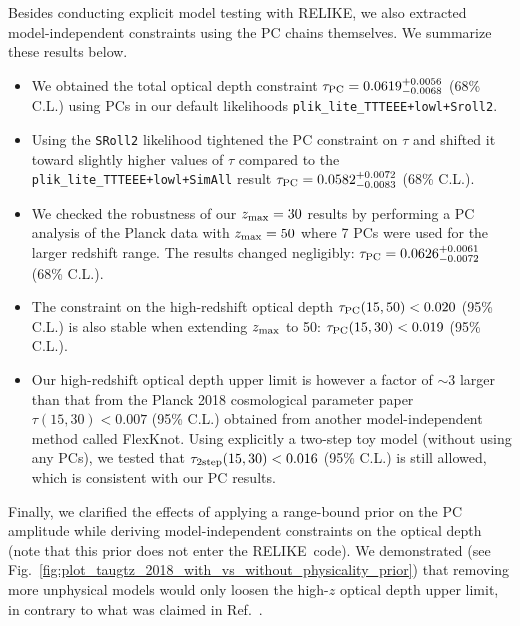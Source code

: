 \documentclass[prd,twocolumn,amsmath,amssymb,floatfix,superscriptaddress,nofootinbib]{revtex4-1}
\newcommand{\zmax}{z_{\rm max}}
\newcommand{\relike}{RELIKE}%
\begin{document}
{Besides conducting explicit model testing with  \relike, we also extracted model-independent constraints using the PC chains themselves. We summarize these results below.

\begin{itemize}

    \item {We obtained the total optical depth constraint $\tau_{\rm PC} = 0.0619^{+0.0056}_{-0.0068}$ (68\% C.L.) 
    using PCs in our default likelihoods \texttt{plik\_lite\_TTTEEE+lowl+Sroll2}.}
    
    \item {Using the \texttt{SRoll2} likelihood tightened the PC constraint on $\tau$ and shifted it toward slightly higher values of $\tau$ compared to the \texttt{plik\_lite\_TTTEEE+lowl+SimAll} result $\tau_{\rm PC} = 0.0582 ^{+0.0072}_{-0.0083}$ (68\% C.L.).}
    
    \item {We checked the robustness of our $\zmax=30$ results by performing a PC analysis of the Planck data with $\zmax = 50$ where 7 PCs were used for the larger redshift range. The results changed negligibly: $\tau_{\rm PC} = 0.0626 ^{+0.0061}_{-0.0072}$ (68\% C.L.).}
    
    \item{The constraint on the high-redshift optical depth $\tau_{\rm PC}(15, 50) < 0.020$ (95\% C.L.) is also stable when extending $\zmax$ to 50: $\tau_{\rm PC}(15, 30) < 0.019$ (95\% C.L.).}
    
     \item {Our high-redshift optical depth upper limit is however a factor of $\sim3$ larger
     than that from the Planck 2018 cosmological parameter paper $\tau(15, 30) < 0.007$ (95\% C.L.) obtained from another model-independent method called FlexKnot. Using explicitly a two-step toy model (without using any PCs), we tested that $\tau_{\rm 2step}(15, 30) < 0.016$ (95\% C.L.) is still allowed, which is consistent with our PC results.}
     
\end{itemize}

Finally, we clarified the effects of applying a range-bound prior on the PC amplitude while deriving model-independent constraints on the optical depth (note that this prior does not enter the \relike\  code). We demonstrated (see Fig.~\ref{fig:plot_taugtz_2018_with_vs_without_physicality_prior}) that removing more unphysical models would only loosen the high-$z$ optical depth upper limit, in contrary to what was claimed in Ref.~\cite{Millea:2018bko}. \\

}
\end{document}
